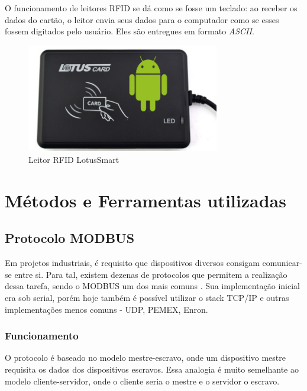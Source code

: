       O funcionamento de leitores \ac{RFID} se dá como se fosse um teclado: ao receber os dados do cartão, o leitor envia seus dados para o computador como se esses fossem digitados pelo usuário. Eles são entregues em formato \textit{ASCII}.

      \begin{figure}[H]
        \begin{center}
          \includegraphics[width=0.75\textwidth,natwidth=655,natheight=368]{assets/images/devices-rfid.jpg}
          \caption{Leitor RFID LotusSmart}
          \label{fig:ihm}
        \end{center}
      \end{figure}

  \section{Métodos e Ferramentas utilizadas}

    \subsection{Protocolo MODBUS}

      Em projetos industriais, é requisito que dispositivos diversos consigam comunicar-se entre si. Para tal, existem dezenas de protocolos que permitem a realização dessa tarefa, sendo o MODBUS um dos mais comuns \cite{modbus-spec-application}. Sua implementação inicial era sob serial, porém hoje também é possível utilizar o stack TCP/IP e outras implementações menos comuns - UDP, PEMEX, Enron.

      \subsubsection{Funcionamento}

        O protocolo é baseado no modelo mestre-escravo, onde um dispositivo mestre requisita os dados dos dispositivos escravos. Essa analogia é muito semelhante ao modelo cliente-servidor, onde o cliente seria o mestre e o servidor o escravo.

